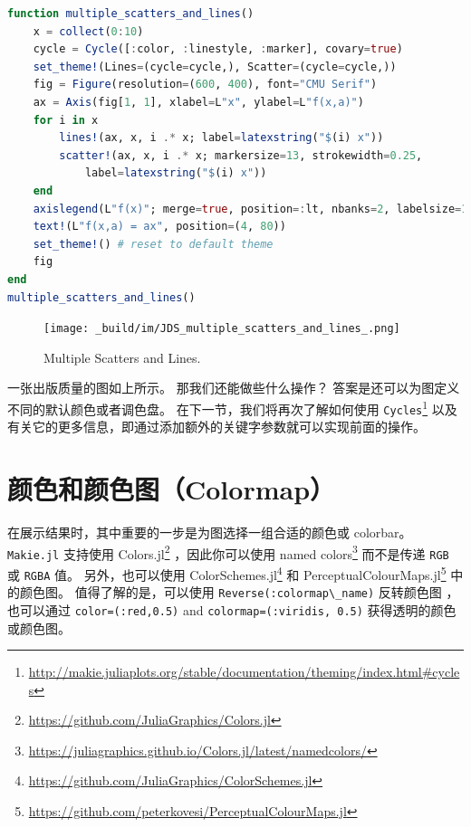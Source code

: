 \documentclass[
  notoc %
]{tufte-book}
\DeclareRobustCommand{\href}[2]{#2\footnote{\url{#1}}}
\newcommand{\passthrough}[1]{#1}
\begin{document}
\begin{lstlisting}[language=Julia]
function multiple_scatters_and_lines()
    x = collect(0:10)
    cycle = Cycle([:color, :linestyle, :marker], covary=true)
    set_theme!(Lines=(cycle=cycle,), Scatter=(cycle=cycle,))
    fig = Figure(resolution=(600, 400), font="CMU Serif")
    ax = Axis(fig[1, 1], xlabel=L"x", ylabel=L"f(x,a)")
    for i in x
        lines!(ax, x, i .* x; label=latexstring("$(i) x"))
        scatter!(ax, x, i .* x; markersize=13, strokewidth=0.25,
            label=latexstring("$(i) x"))
    end
    axislegend(L"f(x)"; merge=true, position=:lt, nbanks=2, labelsize=14)
    text!(L"f(x,a) = ax", position=(4, 80))
    set_theme!() # reset to default theme
    fig
end
multiple_scatters_and_lines()
\end{lstlisting}

\begin{figure}
\hypertarget{fig:multiple_scatters_and_lines}{%
\centering
\texttt{[image: \_build/im/JDS\_multiple\_scatters\_and\_lines\_.png]}
\caption{Multiple Scatters and
Lines.}\label{fig:multiple_scatters_and_lines}
}
\end{figure}

一张出版质量的图如上所示。 那我们还能做些什么操作？
答案是还可以为图定义不同的默认颜色或者调色盘。
在下一节，我们将再次了解如何使用
\href{http://makie.juliaplots.org/stable/documentation/theming/index.html\#cycles}{\passthrough{\lstinline!Cycles!}}
以及有关它的更多信息，即通过添加额外的关键字参数就可以实现前面的操作。

\hypertarget{sec:makie_colors}{%
\section{颜色和颜色图（Colormap）}\label{sec:makie_colors}}

在展示结果时，其中重要的一步是为图选择一组合适的颜色或 colorbar。
\passthrough{\lstinline!Makie.jl!} 支持使用
\href{https://github.com/JuliaGraphics/Colors.jl}{Colors.jl}
，因此你可以使用
\href{https://juliagraphics.github.io/Colors.jl/latest/namedcolors/}{named
colors} 而不是传递 \passthrough{\lstinline!RGB!} 或
\passthrough{\lstinline!RGBA!} 值。 另外，也可以使用
\href{https://github.com/JuliaGraphics/ColorSchemes.jl}{ColorSchemes.jl}
和
\href{https://github.com/peterkovesi/PerceptualColourMaps.jl}{PerceptualColourMaps.jl}
中的颜色图。 值得了解的是，可以使用
\passthrough{\lstinline!Reverse(:colormap\_name)!} 反转颜色图
，也可以通过 \passthrough{\lstinline!color=(:red,0.5)!} and
\passthrough{\lstinline!colormap=(:viridis, 0.5)!}
获得透明的颜色或颜色图。
\end{document}
